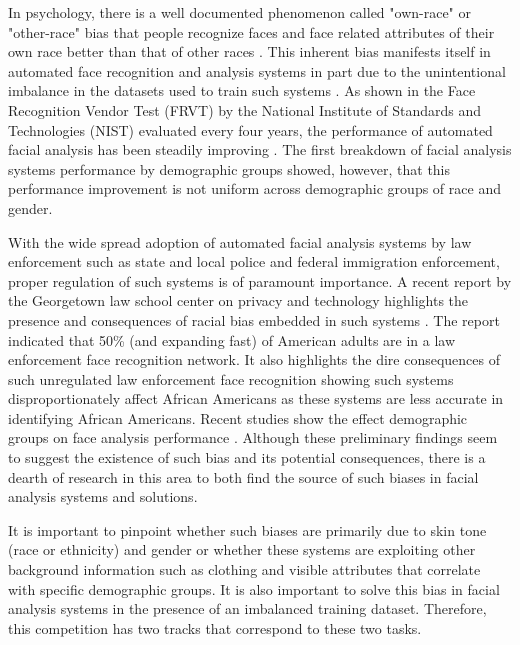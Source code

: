 \documentclass[11pt, oneside]{article}
\makeatletter
\let\@internalcite\cite
\def\cite{\def\citeauthoryear##1##2{##1, ##2}\@internalcite}
\makeatother
\begin{document}
In psychology, there is a well documented phenomenon called "own-race" or 
"other-race" bias that people recognize faces and face related attributes of 
their own race better than that of other races \cite{furl2002face}. This 
inherent bias manifests itself in automated face recognition and analysis 
systems in part due to the unintentional imbalance in the datasets used to 
train such systems \cite{phillips2011other}. As shown in the Face Recognition 
Vendor Test (FRVT) by the National Institute of Standards and Technologies 
(NIST) evaluated every four years, the performance of automated facial analysis 
has been steadily improving \cite{grother2010report}. The first breakdown of 
facial analysis systems performance by demographic groups 
\cite{phillips2011other} showed, however, that this performance improvement is 
not uniform across demographic groups of race and gender.

With the wide spread adoption of automated facial analysis systems by law 
enforcement such as state and local police and federal immigration enforcement, 
proper regulation of such systems is of paramount importance. A recent report 
by the Georgetown law school center on privacy and technology highlights the 
presence and consequences of racial bias embedded in such systems 
\cite{garvie2016perpetual}. The report indicated that 50\% (and expanding fast) 
of American adults are in a law enforcement face recognition network. It also 
highlights the dire consequences of such unregulated law enforcement face 
recognition showing such systems disproportionately affect African Americans as 
these systems are less accurate in identifying African Americans. Recent 
studies show the effect demographic groups on face analysis performance 
\cite{han2015demographic} \cite{farinella2012demographic} \cite{klare2012face}. 
Although these preliminary findings seem to suggest the existence of such bias 
and its potential consequences, there is a dearth of research in this area to 
both find the source of such biases in facial analysis systems and solutions.

It is important to pinpoint whether such biases are primarily due to skin tone 
(race or ethnicity) and gender or whether these systems are exploiting other background 
information such as clothing and visible attributes that correlate with 
specific demographic groups. It is also important to solve this bias in facial 
analysis systems in the presence of an imbalanced training dataset. Therefore, 
this competition has two tracks that correspond to these two tasks.
\end{document}
